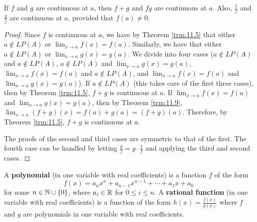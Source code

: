 \documentclass[../main.tex]{subfiles}
\begin{document}
\begin{corollary}\label{cly:11.10}
    If $f$ and $g$ are continuous at $a$, then $f+g$ and $fg$ are continuous at $a$. Also, $\frac{1}{f}$ and $\frac{g}{f}$ are continuous at $a$, provided that $f(a)\neq 0$.
    \begin{proof}
        Since $f$ is continuous at $a$, we have by Theorem \ref{trm:11.5} that either $a\notin LP(A)$ or $\lim_{x\to a}f(x)=f(a)$. Similarly, we have that either $a\notin LP(A)$ or $\lim_{x\to a}g(x)=g(a)$. We divide into four cases ($a\notin LP(A)$ and $a\notin LP(A)$, $a\notin LP(A)$ and $\lim_{x\to a}g(x)=g(a)$, $\lim_{x\to a}f(x)=f(a)$ and $a\notin LP(A)$, and $\lim_{x\to a}f(x)=f(a)$ and $\lim_{x\to a}g(x)=g(a)$). If $a\notin LP(A)$ (this takes care of the first three cases), then by Theorem \ref{trm:11.5}, $f+g$ is continuous at $a$. If $\lim_{x\to a}f(x)=f(a)$ and $\lim_{x\to a}g(x)=g(a)$, then by Theorem \ref{trm:11.9}, $\lim_{x\to a}(f+g)(x)=f(a)+g(a)=(f+g)(a)$. Therefore, by Theorem \ref{trm:11.5}, $f+g$ is continuous at $a$.\par
        The proofs of the second and third cases are symmetric to that of the first. The fourth case can be handled by letting $\frac{g}{f}=g\cdot\frac{1}{f}$ and applying the third and second cases.
    \end{proof}
\end{corollary}

\begin{definition}\label{dfn:11.11}
    A \textbf{polynomial} (in one variable with real coefficients) is a function $f$ of the form
    \begin{equation*}
        f(x) = a_nx^n+a_{n-1}x^{n-1}+\cdots+a_1x+a_0
    \end{equation*}
    for some $n\in\mathbb{N}\cup\{0\}$, where $a_i\in\mathbb{R}$ for $0\leq i\leq n$. A \textbf{rational function} (in one variable with real coefficients) is a function of the form $h(x)=\frac{f(x)}{g(x)}$ where $f$ and $g$ are polynomials in one variable with real coefficients.
\end{definition}
\end{document}

